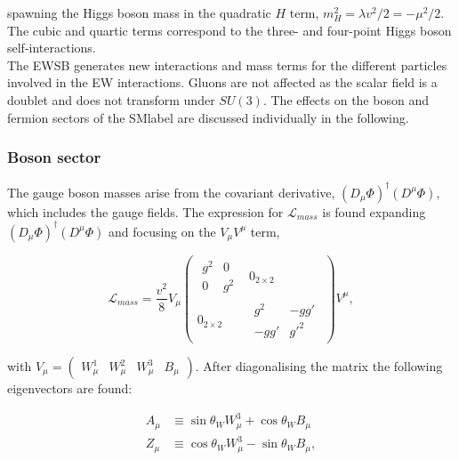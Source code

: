 spawning the Higgs boson mass in the quadratic $H$ term, $m_H^2=\lambda v^2/2 = -\mu^2/2$.
The cubic and quartic terms correspond to the three- and four-point Higgs boson self-interactions.\\

The \acrshort{EWSB} generates new interactions and mass terms for the different particles involved in the \acrshort{EW} interactions.
Gluons are not affected as the scalar field is a doublet and does not transform under $SU(3)$. The effects on the boson and fermion sectors of the \acrshort{SMlabel} are discussed individually in the following. 

\subsubsection{Boson sector}

The gauge boson masses arise from the covariant derivative, $(D_\mu\Phi)^\dag(D^\mu\Phi)$, which includes the gauge fields. The expression for $\mathcal{L}_{mass}$ is found expanding $(D_\mu\Phi)^\dag(D^\mu\Phi)$ and focusing on the $V_\mu V^\mu$ term,

\begin{equation}
\label{Theory_eq:Lgaugemass}
\mathcal{L}_{mass} = \frac{v^2}{8}
V_\mu
\begin{pmatrix} \begin{matrix} g^2 & 0 \\ 0 & g^2 \end{matrix} & 0_{2\times2} \\ 0_{2\times2} & \begin{matrix} g^2 & -gg' \\ -gg' & g'^2 \end{matrix}
\end{pmatrix} V^\mu ,
\end{equation}

with $V_\mu = \begin{pmatrix} W_\mu^1 & W_\mu^2 & W_\mu^3 & B_\mu
\end{pmatrix}$. After diagonalising the matrix the following eigenvectors are found:

\begin{equation}
\begin{split}
    A_\mu &\equiv \sin\theta_W W_\mu^3 + \cos\theta_WB_\mu \\
    Z_\mu &\equiv \cos\theta_W W_\mu^3 - \sin\theta_WB_\mu,
\end{split}
\end{equation}

